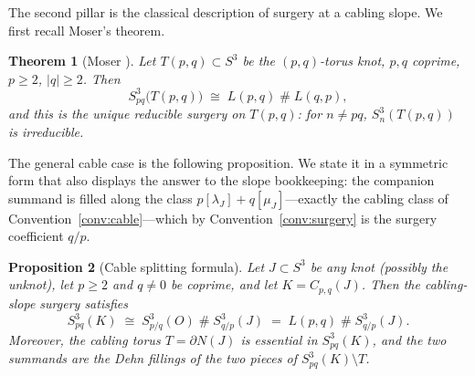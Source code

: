 \documentclass[11pt]{article}
\newtheorem{theorem}{Theorem}[section]
\newtheorem{proposition}[theorem]{Proposition}
\theoremstyle{definition}
\theoremstyle{remark}
\numberwithin{equation}{section}
\begin{document}
The second pillar is the classical description of surgery at a cabling
slope.  We first recall Moser's theorem.

\begin{theorem}[Moser {\cite{Mos71}}]\label{thm:moser}
Let $T(p,q)\subset S^{3}$ be the $(p,q)$-torus knot, $p,q$ coprime,
$p\ge2$, $|q|\ge 2$.  Then
\[
S^{3}_{pq}\bigl(T(p,q)\bigr)\;\cong\;L(p,q)\;\#\;L(q,p),
\]
and this is the unique reducible surgery on $T(p,q)$: for $n\neq pq$,
$S^{3}_{n}(T(p,q))$ is irreducible.
\end{theorem}

The general cable case is the following proposition.  We state it in a
symmetric form that also displays the answer to the slope bookkeeping:
the companion summand is filled along the class
$p[\lambda_{J}]+q[\mu_{J}]$---exactly the cabling class of
Convention~\ref{conv:cable}---which by Convention~\ref{conv:surgery} is
the surgery coefficient $q/p$.

\begin{proposition}[Cable splitting formula]\label{prop:cable-split}
Let $J\subset S^{3}$ be any knot (possibly the unknot), let $p\ge2$ and
$q\neq0$ be coprime, and let $K=C_{p,q}(J)$.  Then the cabling-slope
surgery satisfies
\[
S^{3}_{pq}(K)\;\cong\;S^{3}_{p/q}(O)\;\#\;S^{3}_{q/p}(J)
\;=\;L(p,q)\;\#\;S^{3}_{q/p}(J).
\]
Moreover, the cabling torus $T=\partial N(J)$ is essential in
$S^{3}_{pq}(K)$, and the two summands are the Dehn fillings of the two
pieces of $S^{3}_{pq}(K)\setminus T$.
\end{proposition}
\end{document}
